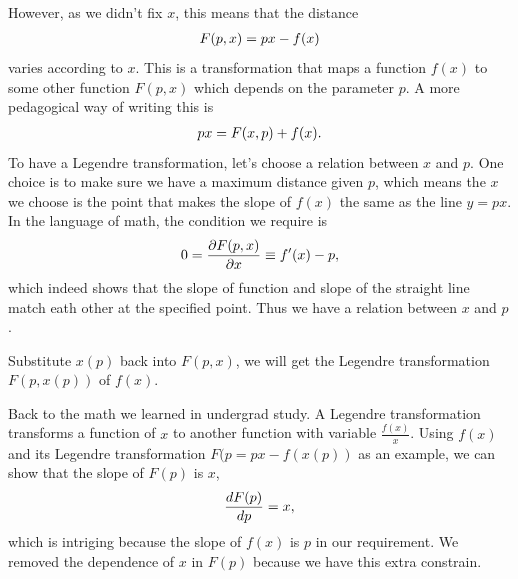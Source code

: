 \documentclass[letterpaper,10pt,english]{sphinxmanual}
\begin{document}
However, as we didn't fix \(x\), this means that the distance
\begin{gather}
\begin{split}F(p,x) = p x - f(x)\end{split}\notag
\end{gather}
varies according to \(x\). This is a transformation that maps a function \(f(x)\) to some other function \(F(p,x)\) which depends on the parameter \(p\). A more pedagogical way of writing this is
\begin{gather}
\begin{split}px = F(x,p) + f(x).\end{split}\notag
\end{gather}
To have a Legendre transformation, let's choose a relation between \(x\) and \(p\). One choice is to make sure we have a maximum distance given \(p\), which means the \(x\) we choose is the point that makes the slope of \(f(x)\) the same as the line \(y=px\). In the language of math, the condition we require is
\begin{gather}
\begin{split}0 = \frac{\partial F(p,x)}{\partial x} \equiv f'(x) - p,\end{split}\notag
\end{gather}
which indeed shows that the slope of function and slope of the straight line match eath other at the specified point. Thus we have a relation between \(x\) and \(p\).

Substitute \(x(p)\) back into \(F(p,x)\), we will get the Legendre transformation \(F(p,x(p))\) of \(f(x)\).

Back to the math we learned in undergrad study. A Legendre transformation transforms a function of \(x\) to another function with variable \(\frac{f(x)}{x}\). Using \(f(x)\) and its Legendre transformation \(F(p = p x - f(x(p))\) as an example, we can show that the slope of \(F(p)\) is \(x\),
\begin{gather}
\begin{split}\frac{d F(p)}{d p} = x,\end{split}\notag
\end{gather}
which is intriging because the slope of \(f(x)\) is \(p\) in our requirement. We removed the dependence of \(x\) in \(F(p)\) because we have this extra constrain.
\end{document}
